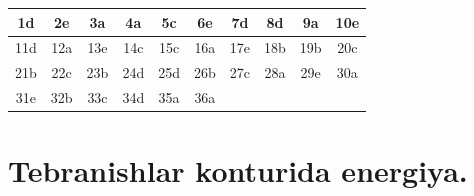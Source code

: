 \begin{table}[h!]
\centering
\begin{tabular}{|c|c|c|c|c|c|c|c|c|c|}
\hline
1d & 2e & 3a & 4a & 5c & 6e & 7d & 8d & 9a & 10e \\ \hline
11d & 12a & 13e & 14c & 15c & 16a & 17e & 18b & 19b & 20c \\ \hline
21b & 22c & 23b & 24d & 25d & 26b & 27c & 28a & 29e & 30a \\ \hline
31e & 32b & 33c & 34d & 35a & 36a &  &  &  &  \\ \hline
\end{tabular}
\end{table}



\section{Tebranishlar konturida energiya.}


